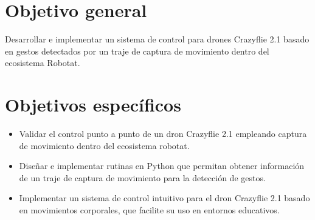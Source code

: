 \section*{Objetivo general}
Desarrollar e implementar un sistema de control para drones Crazyflie 2.1 basado en gestos detectados por un traje de captura de movimiento dentro del ecosistema Robotat. 

\section*{Objetivos específicos}

\begin{itemize}
    \item Validar el control punto a punto de un dron Crazyflie 2.1 empleando captura de movimiento dentro del ecosistema robotat.
    
    \item Diseñar e implementar rutinas en Python que permitan obtener información de un traje de captura de movimiento para la detección de gestos.
    
    \item Implementar un sistema de control intuitivo para el dron Crazyflie 2.1 basado en movimientos corporales, que facilite su uso en entornos educativos.
    
\end{itemize}
